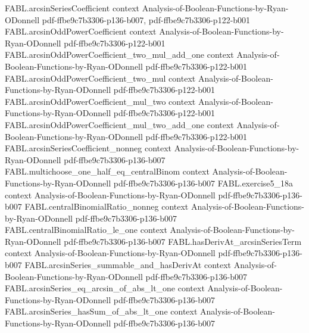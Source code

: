 \begin{theorem}
\label{FABL.limitingMajorityFourierWeight_hasSum_one}
\leanok
{}
\proofstep
  {FABL.arcsinSeriesCoefficient}
  {context}
  {Analysis-of-Boolean-Functions-by-Ryan-ODonnell}
  {pdf-ffbe9c7b3306-p136-b007,
    pdf-ffbe9c7b3306-p122-b001}
\proofstep
  {FABL.arcsinOddPowerCoefficient}
  {context}
  {Analysis-of-Boolean-Functions-by-Ryan-ODonnell}
  {pdf-ffbe9c7b3306-p122-b001}
\proofstep
  {FABL.arcsinOddPowerCoefficient_two_mul_add_one}
  {context}
  {Analysis-of-Boolean-Functions-by-Ryan-ODonnell}
  {pdf-ffbe9c7b3306-p122-b001}
\proofstep
  {FABL.arcsinOddPowerCoefficient_two_mul}
  {context}
  {Analysis-of-Boolean-Functions-by-Ryan-ODonnell}
  {pdf-ffbe9c7b3306-p122-b001}
\proofstep
  {FABL.arcsinOddPowerCoefficient_mul_two}
  {context}
  {Analysis-of-Boolean-Functions-by-Ryan-ODonnell}
  {pdf-ffbe9c7b3306-p122-b001}
\proofstep
  {FABL.arcsinOddPowerCoefficient_mul_two_add_one}
  {context}
  {Analysis-of-Boolean-Functions-by-Ryan-ODonnell}
  {pdf-ffbe9c7b3306-p122-b001}
\proofstep
  {FABL.arcsinSeriesCoefficient_nonneg}
  {context}
  {Analysis-of-Boolean-Functions-by-Ryan-ODonnell}
  {pdf-ffbe9c7b3306-p136-b007}
\proofstep
  {FABL.multichoose_one_half_eq_centralBinom}
  {context}
  {Analysis-of-Boolean-Functions-by-Ryan-ODonnell}
  {pdf-ffbe9c7b3306-p136-b007}
\proofstep
  {FABL.exercise5_18a}
  {context}
  {Analysis-of-Boolean-Functions-by-Ryan-ODonnell}
  {pdf-ffbe9c7b3306-p136-b007}
\proofstep
  {FABL.centralBinomialRatio_nonneg}
  {context}
  {Analysis-of-Boolean-Functions-by-Ryan-ODonnell}
  {pdf-ffbe9c7b3306-p136-b007}
\proofstep
  {FABL.centralBinomialRatio_le_one}
  {context}
  {Analysis-of-Boolean-Functions-by-Ryan-ODonnell}
  {pdf-ffbe9c7b3306-p136-b007}
\proofstep
  {FABL.hasDerivAt_arcsinSeriesTerm}
  {context}
  {Analysis-of-Boolean-Functions-by-Ryan-ODonnell}
  {pdf-ffbe9c7b3306-p136-b007}
\proofstep
  {FABL.arcsinSeries_summable_and_hasDerivAt}
  {context}
  {Analysis-of-Boolean-Functions-by-Ryan-ODonnell}
  {pdf-ffbe9c7b3306-p136-b007}
\proofstep
  {FABL.arcsinSeries_eq_arcsin_of_abs_lt_one}
  {context}
  {Analysis-of-Boolean-Functions-by-Ryan-ODonnell}
  {pdf-ffbe9c7b3306-p136-b007}
\proofstep
  {FABL.arcsinSeries_hasSum_of_abs_lt_one}
  {context}
  {Analysis-of-Boolean-Functions-by-Ryan-ODonnell}
  {pdf-ffbe9c7b3306-p136-b007}
\proofstep

\end{theorem}
